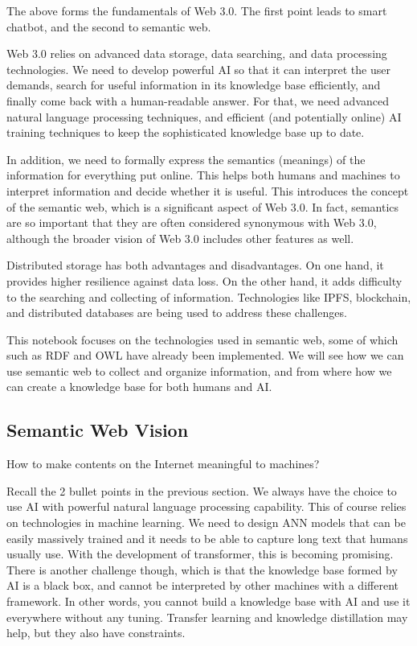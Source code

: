 The above forms the fundamentals of Web 3.0. The first point leads to smart chatbot, and the second to semantic web.

Web 3.0 relies on advanced data storage, data searching, and data processing technologies. We need to develop powerful AI so that it can interpret the user demands, search for useful information in its knowledge base efficiently, and finally come back with a human-readable answer. For that, we need advanced natural language processing techniques, and efficient (and potentially online) AI training techniques to keep the sophisticated knowledge base up to date.

In addition, we need to formally express the semantics (meanings) of the information for everything put online. This helps both humans and machines to interpret information and decide whether it is useful. This introduces the concept of the semantic web, which is a significant aspect of Web 3.0. In fact, semantics are so important that they are often considered synonymous with Web 3.0, although the broader vision of Web 3.0 includes other features as well.

Distributed storage has both advantages and disadvantages. On one hand, it provides higher resilience against data loss. On the other hand, it adds difficulty to the searching and collecting of information. Technologies like IPFS, blockchain, and distributed databases are being used to address these challenges.

This notebook focuses on the technologies used in semantic web, some of which such as RDF and OWL have already been implemented. We will see how we can use semantic web to collect and organize information, and from where how we can create a knowledge base for both humans and AI.

\subsection{Semantic Web Vision}

How to make contents on the Internet meaningful to machines?

Recall the 2 bullet points in the previous section. We always have the choice to use AI with powerful natural language processing capability. This of course relies on technologies in machine learning. We need to design ANN models that can be easily massively trained and it needs to be able to capture long text that humans usually use. With the development of transformer, this is becoming promising. There is another challenge though, which is that the knowledge base formed by AI is a black box, and cannot be interpreted by other machines with a different framework. In other words, you cannot build a knowledge base with AI and use it everywhere without any tuning. Transfer learning and knowledge distillation may help, but they also have constraints.

